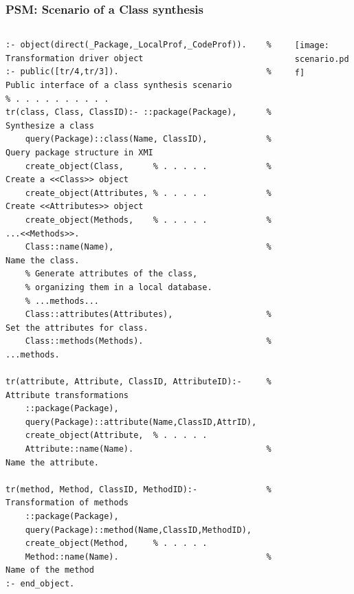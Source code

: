\documentclass[10pt]{beamer}
\begin{document}
\begin{frame}[fragile]
  \frametitle{PSM: Scenario of a Class synthesis}

  \begin{columns}
    \begin{column}{0.6\textwidth}
\begin{verbatim}
:- object(direct(_Package,_LocalProf,_CodeProf)).    % Transformation driver object
:- public([tr/4,tr/3]).                              % Public interface of a class synthesis scenario
% . . . . . . . . . .
tr(class, Class, ClassID):- ::package(Package),      % Synthesize a class
    query(Package)::class(Name, ClassID),            % Query package structure in XMI
    create_object(Class,      % . . . . .            % Create a <<Class>> object
    create_object(Attributes, % . . . . .            % Create <<Attributes>> object
    create_object(Methods,    % . . . . .            % ...<<Methods>>.
    Class::name(Name),                               % Name the class.
    % Generate attributes of the class,
    % organizing them in a local database.
    % ...methods...
    Class::attributes(Attributes),                   % Set the attributes for class.
    Class::methods(Methods).                         % ...methods.

tr(attribute, Attribute, ClassID, AttributeID):-     % Attribute transformations
    ::package(Package),
    query(Package)::attribute(Name,ClassID,AttrID),
    create_object(Attribute,  % . . . . .
    Attribute::name(Name).                           % Name the attribute.

tr(method, Method, ClassID, MethodID):-              % Transformation of methods
    ::package(Package),
    query(Package)::method(Name,ClassID,MethodID),
    create_object(Method,     % . . . . .
    Method::name(Name).                              % Name of the method
:- end_object.
\end{verbatim}
    \end{column}
    \begin{column}{0.4\linewidth}
      \texttt{[image: scenario.pdf]}
    \end{column}
  \end{columns}
\end{frame}
\end{document}
